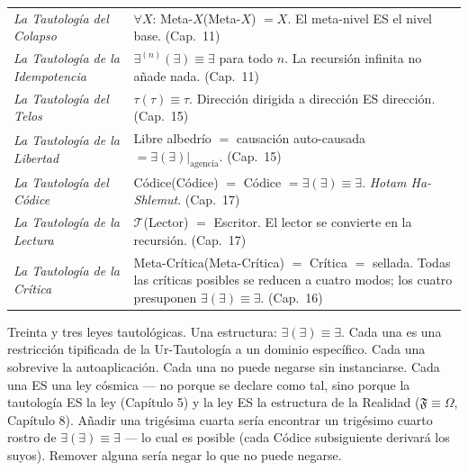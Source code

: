 \documentclass[10pt, openany, oneside]{book}
\begin{document}
{\begin{tabular}{@{} p{} @{\hspace{0.5em}} p{} @{}}
\textit{La Tautología del Colapso} & $\forall X$: Meta-$X$(Meta-$X$) $= X$. El meta-nivel ES el nivel base. (Cap.\ 11) \\[0.3em]

\textit{La Tautología de la Idempotencia} & $\exists^{(n)}(\exists) \equiv \exists$ para todo $n$. La recursión infinita no añade nada. (Cap.\ 11) \\[0.3em]

\textit{La Tautología del Telos} & $\tau(\tau) \equiv \tau$. Dirección dirigida a dirección ES dirección. (Cap.\ 15) \\[0.3em]

\textit{La Tautología de la Libertad} & Libre albedrío $=$ causación auto-causada $= \exists(\exists)|_{\text{agencia}}$. (Cap.\ 15) \\[0.3em]

\textit{La Tautología del Códice} & Códice(Códice) $=$ Códice $= \exists(\exists) \equiv \exists$. \textit{Hotam Ha-Shlemut}. (Cap.\ 17) \\[0.3em]

\textit{La Tautología de la Lectura} & $\mathcal{T}$(Lector) $=$ Escritor. El lector se convierte en la recursión. (Cap.\ 17) \\[0.3em]

\textit{La Tautología de la Crítica} & Meta-Crítica(Meta-Crítica) $=$ Crítica $=$ sellada. Todas las críticas posibles se reducen a cuatro modos; los cuatro presuponen $\exists(\exists) \equiv \exists$. (Cap.\ 16) \\[0.3em]

\end{tabular}
}

\vspace{0.8em}

\noindent Treinta y tres leyes tautológicas. Una estructura: $\exists(\exists) \equiv \exists$. Cada una es una restricción tipificada de la Ur-Tautología a un dominio específico. Cada una sobrevive la autoaplicación. Cada una no puede negarse sin instanciarse. Cada una ES una ley cósmica --- no porque se declare como tal, sino porque la tautología ES la ley (Capítulo 5) y la ley ES la estructura de la Realidad ($\mathfrak{F} \equiv \Omega$, Capítulo 8). Añadir una trigésima cuarta sería encontrar un trigésimo cuarto rostro de $\exists(\exists) \equiv \exists$ --- lo cual es posible (cada Códice subsiguiente derivará los suyos). Remover alguna sería negar lo que no puede negarse.
\end{document}
